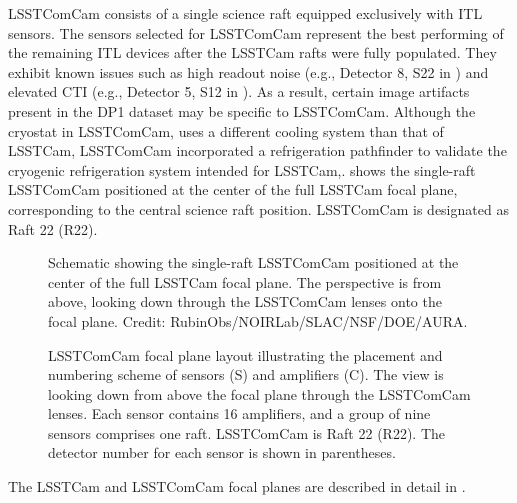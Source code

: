 \gls{LSSTComCam} consists of a single science  \gls{raft} equipped exclusively with \gls{ITL} sensors.
The sensors selected for \gls{LSSTComCam} represent  the best performing of the remaining ITL devices after the \gls{LSSTCam}  \gls{raft}s were fully populated.
They  exhibit known issues such as high readout noise (e.g., Detector 8, S22 in ) and elevated \gls{CTI} (e.g., Detector 5, S12 in ).
As a result, certain image artifacts present in the \gls{DP1} dataset may be specific to LSSTComCam.
Although the cryostat in \gls{LSSTComCam}, uses a different cooling system than that of \gls{LSSTCam}, \gls{LSSTComCam} incorporated a refrigeration pathfinder to validate the cryogenic refrigeration system intended for \gls{LSSTCam},.
 shows the single-raft \gls{LSSTComCam} positioned at the center of the full LSSTCam focal plane, corresponding to the central science \gls{raft} position.
\gls{LSSTComCam} is designated as Raft 22 (R22).
\begin{figure}[htb]
\caption{Schematic showing the single-raft LSSTComCam positioned at the center of the full LSSTCam focal plane. The perspective is from above, looking down through the LSSTComCam lenses onto the focal plane.
Credit: RubinObs/NOIRLab/SLAC/NSF/DOE/AURA.}
\label{fig:comcam_raft_in_lsstcam_focal_plane}
\end{figure}

\begin{figure}[htb!]
\caption{LSSTComCam focal plane layout illustrating the placement and numbering scheme of sensors (S) and amplifiers (C). The view is looking down from above the focal plane through the LSSTComCam lenses. Each sensor contains 16 amplifiers, and a group of nine sensors comprises one raft. LSSTComCam is Raft 22 (R22). The detector number for each sensor is shown in parentheses.}
\label{fig:comcam_focal_plane}
\end{figure}
The \gls{LSSTCam} and \gls{LSSTComCam} focal planes are described in detail in \citet{CTN-001}.

